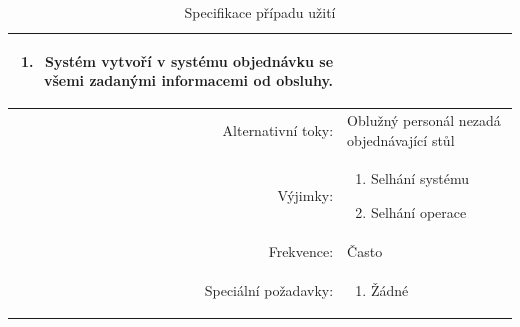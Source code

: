 \begin{table}[ht!]
{\begin{tabular}{| r | p{12cm} |}
\begin{minipage}[t]{0.75\textwidth}
\begin{enumerate}[nosep,after=\strut]
            \item Systém vytvoří v systému objednávku se všemi zadanými informacemi od obsluhy.
    	\end{enumerate}
  	\end{minipage} \\
    \hline 
    Alternativní toky: & Oblužný personál nezadá objednávající stůl  \\
    \hline
    Výjimky: & 
    \begin{minipage}[t]{0.75\textwidth}
    	\begin{enumerate}[nosep,after=\strut] 
            \item Selhání systému
            \item Selhání operace
    	\end{enumerate}
  	\end{minipage} \\
    \hline
    Frekvence: & Často \\
    \hline
    Speciální požadavky: & 
    \begin{minipage}[t]{0.75\textwidth}
    	\begin{enumerate}[nosep,after=\strut]
    		\item Žádné
    	\end{enumerate}
  	\end{minipage} \\
    \hline

\end{tabular}}
\caption{Specifikace případu užití }
\label{table:1}
\end{table}

